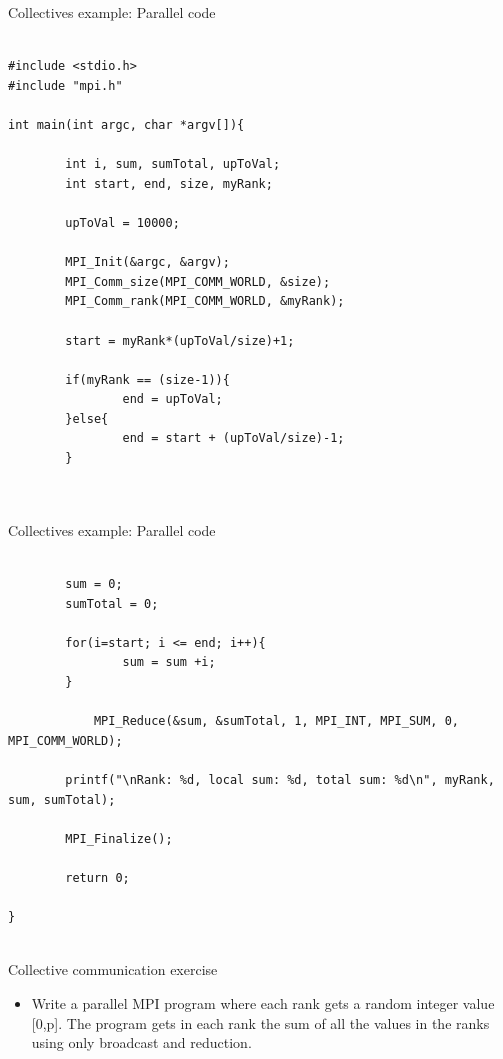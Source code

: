 \begin{frame}[fragile]{Collectives example: Parallel code}
  \vspace{-3mm}
\scriptsize\begin{verbatim}

#include <stdio.h>
#include "mpi.h"

int main(int argc, char *argv[]){

        int i, sum, sumTotal, upToVal;
        int start, end, size, myRank;

        upToVal = 10000;

        MPI_Init(&argc, &argv);
        MPI_Comm_size(MPI_COMM_WORLD, &size);
        MPI_Comm_rank(MPI_COMM_WORLD, &myRank);

        start = myRank*(upToVal/size)+1;

        if(myRank == (size-1)){
                end = upToVal;
        }else{
              	end = start + (upToVal/size)-1;
        }



\end{verbatim}
\normalsize
   

\end{frame}

\begin{frame}[fragile]{Collectives example: Parallel code}
  \vspace{-3mm}
\scriptsize\begin{verbatim}

        sum = 0;
        sumTotal = 0;

        for(i=start; i <= end; i++){
                sum = sum +i;
        }

	        MPI_Reduce(&sum, &sumTotal, 1, MPI_INT, MPI_SUM, 0, MPI_COMM_WORLD);

        printf("\nRank: %d, local sum: %d, total sum: %d\n", myRank, sum, sumTotal);

        MPI_Finalize();

        return 0;

}


\end{verbatim}
\normalsize
   

\end{frame}

\begin{frame}[fragile]{Collective communication exercise}
 \vspace{25mm}

\begin{itemize}
\item Write a parallel MPI program where each rank gets a random integer value [0,p]. The program gets in each rank the sum of all the values in the ranks using only broadcast and reduction.
\end{itemize}
\end{frame}


